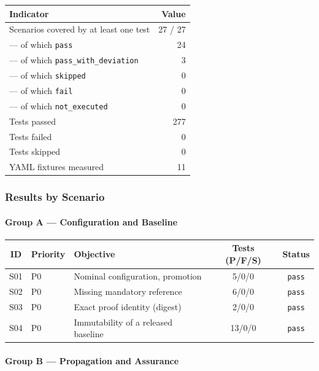\documentclass[10pt]{article}
\newcommand{\statuspass}{\textcolor{passgreen}{\texttt{pass}}}
\newcommand{\statusdeviation}{\textcolor{deviationorange}{\texttt{pass\_with\_deviation}}}
\newcommand{\statusskip}{\textcolor{skipgray}{\texttt{skipped}}}
\newcommand{\statusfail}{\textcolor{failred}{\texttt{fail}}}
\newcommand{\statusnotexec}{\texttt{not\_executed}}
\begin{document}
\begin{table}[htbp]
	\centering
	\begin{tabular}{@{}lr@{}}
		\toprule
		\textbf{Indicator} & \textbf{Value} \\
		\midrule
		Scenarios covered by at least one test & 27 / 27 \\
		\quad --- of which \statuspass{} & 24 \\
		\quad --- of which \statusdeviation{} & 3 \\
		\quad --- of which \statusskip{} & 0 \\
		\quad --- of which \statusfail{} & 0 \\
		\quad --- of which \statusnotexec{} & 0 \\
		Tests passed & 277 \\
		Tests failed & 0 \\
		Tests skipped & 0 \\
		YAML fixtures measured & 11 \\
		\bottomrule
	\end{tabular}
\end{table}

\subsubsection{Results by Scenario}

\paragraph{Group A --- Configuration and Baseline}

\begin{table}[htbp]
	\centering
	\small
	\begin{tabular}{@{}clp{6.5cm}cc@{}}
		\toprule
		\textbf{ID} & \textbf{Priority} & \textbf{Objective} & \textbf{Tests (P/F/S)} & \textbf{Status} \\
		\midrule
		S01 & P0 & Nominal configuration, promotion & 5/0/0 & \statuspass{} \\
		S02 & P0 & Missing mandatory reference & 6/0/0 & \statuspass{} \\
		S03 & P0 & Exact proof identity (digest) & 2/0/0 & \statuspass{} \\
		S04 & P0 & Immutability of a released baseline & 13/0/0 & \statuspass{} \\
		\bottomrule
	\end{tabular}
\end{table}

\paragraph{Group B --- Propagation and Assurance}
\end{document}
